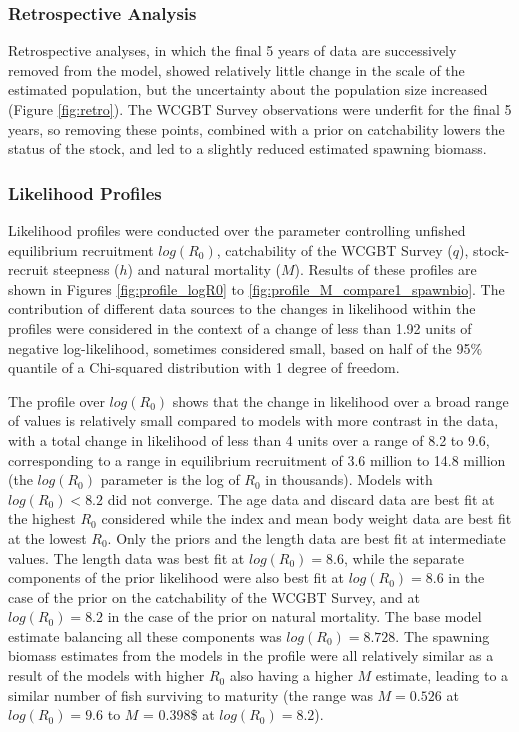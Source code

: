 \documentclass[12pt,]{article}
\begin{document}
\hypertarget{retrospective-analysis}{%
\subsubsection{Retrospective Analysis}\label{retrospective-analysis}}

Retrospective analyses, in which the final 5 years of data are
successively removed from the model, showed relatively little change in
the scale of the estimated population, but the uncertainty about the
population size increased (Figure \ref{fig:retro}). The WCGBT Survey
observations were underfit for the final 5 years, so removing these
points, combined with a prior on catchability lowers the status of the
stock, and led to a slightly reduced estimated spawning biomass.

\hypertarget{likelihood-profiles}{%
\subsubsection{Likelihood Profiles}\label{likelihood-profiles}}

Likelihood profiles were conducted over the parameter controlling
unfished equilibrium recruitment \(log(R_0)\), catchability of the WCGBT
Survey (\(q\)), stock-recruit steepness (\(h\)) and natural mortality
(\(M\)). Results of these profiles are shown in Figures
\ref{fig:profile_logR0} to \ref{fig:profile_M_compare1_spawnbio}. The
contribution of different data sources to the changes in likelihood
within the profiles were considered in the context of a change of less
than 1.92 units of negative log-likelihood, sometimes considered small,
based on half of the 95\% quantile of a Chi-squared distribution with 1
degree of freedom.

The profile over \(log(R_0)\) shows that the change in likelihood over a
broad range of values is relatively small compared to models with more
contrast in the data, with a total change in likelihood of less than 4
units over a range of 8.2 to 9.6, corresponding to a range in
equilibrium recruitment of 3.6 million to 14.8 million (the \(log(R_0)\)
parameter is the log of \(R_0\) in thousands). Models with
\(log(R_0) < 8.2\) did not converge. The age data and discard data are
best fit at the highest \(R_0\) considered while the index and mean body
weight data are best fit at the lowest \(R_0\). Only the priors and the
length data are best fit at intermediate values. The length data was
best fit at \(log(R_0) = 8.6\), while the separate components of the
prior likelihood were also best fit at \(log(R_0) = 8.6\) in the case of
the prior on the catchability of the WCGBT Survey, and at
\(log(R_0) = 8.2\) in the case of the prior on natural mortality. The
base model estimate balancing all these components was
\(log(R_0) = 8.728\). The spawning biomass estimates from the models in
the profile were all relatively similar as a result of the models with
higher \(R_0\) also having a higher \(M\) estimate, leading to a similar
number of fish surviving to maturity (the range was \(M = 0.526\) at
\(log(R_0) = 9.6\) to \(M\) = 0.398\$ at \(log(R_0) = 8.2\)).
\end{document}
